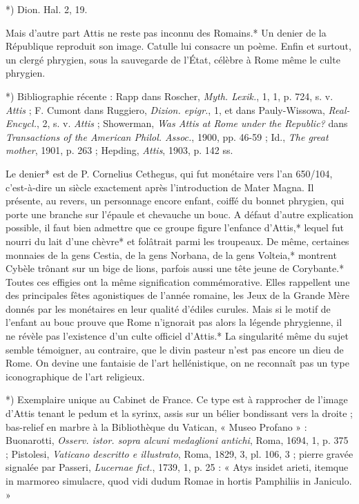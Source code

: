\documentclass[a4paper, 11pt, oneside, polutonikogreek, french]{article}
\begin{document}
*) Dion. Hal. 2, 19.

Mais d'autre part Attis ne reste pas inconnu des Romains.* Un denier de la République reproduit son image. Catulle lui consacre un poème. Enfin et surtout, un clergé phrygien, sous la sauvegarde de l'État, célèbre à Rome même le culte phrygien.

*) Bibliographie récente : Rapp dans Roscher, \emph{Myth. Lexik.}, 1, 1, p. 724, s. v. \emph{Attis} ; F. Cumont dans Ruggiero, \emph{Dizion. epigr.}, 1, et dans Pauly-Wissowa, \emph{Real-Encycl.}, 2, s. v. \emph{Attis} ; Showerman, \emph{Was Attis at Rome under the Republic?} dans \emph{Transactions of the American Philol. Assoc.}, 1900, pp. 46-59 ; Id., \emph{The great mother}, 1901, p. 263 ; Hepding, \emph{Attis}, 1903, p. 142 ss.

Le denier* est de P. Cornelius Cethegus, qui fut monétaire vers l'an 650/104, c'est-à-dire un siècle exactement après l'introduction de Mater Magna. Il présente, au revers, un personnage encore enfant, coiffé du bonnet phrygien, qui porte une branche sur l'épaule et chevauche un bouc. A défaut d'autre explication possible, il faut bien admettre que ce groupe figure l'enfance d'Attis,* lequel fut nourri du lait d'une chèvre* et folâtrait parmi les troupeaux. De même, certaines monnaies de la gens Cestia, de la gens Norbana, de la gens Volteia,* montrent Cybèle trônant sur un bige de lions, parfois aussi une tête jeune de Corybante.* Toutes ces effigies ont la même signification commémorative. Elles rappellent une des principales fêtes agonistiques de l'année romaine, les Jeux de la Grande Mère donnés par les monétaires en leur qualité d'édiles curules. Mais si le motif de l'enfant au bouc prouve que Rome n'ignorait pas alors la légende phrygienne, il ne révèle pas l'existence d'un culte officiel d'Attis.* La singularité même du sujet semble témoigner, au contraire, que le divin pasteur n'est pas encore un dieu de Rome. On devine une fantaisie de l'art hellénistique, on ne reconnaît pas un type iconographique de l'art religieux.

*) Exemplaire unique au Cabinet de France. Ce type est à rapprocher de l'image d'Attis tenant le pedum et la syrinx, assis sur un bélier bondissant vers la droite ; bas-relief en marbre à la Bibliothèque du Vatican, « Museo Profano » : Buonarotti, \emph{Osserv. istor. sopra alcuni medaglioni antichi}, Roma, 1694, 1, p. 375 ; Pistolesi, \emph{Vaticano descritto e illustrato}, Roma, 1829, 3, pl. 106, 3 ; pierre gravée signalée par Passeri, \emph{Lucernae fict.}, 1739, 1, p. 25 : « Atys insidet arieti, itemque in marmoreo simulacre, quod vidi dudum Romae in hortis Pamphiliis in Janiculo. »
\end{document}
